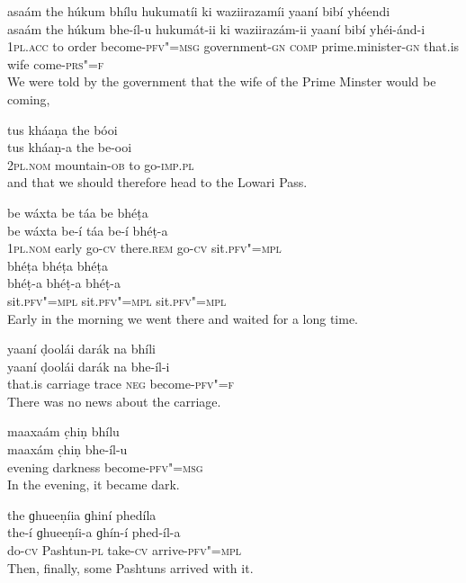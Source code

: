 \begin{exe}
\ex
\label{ex:1}
\glll asaám	the	húkum	bhílu	hukumatíi	ki waziirazamíi	yaaní	bibí	yhéendi \\
asaám	the	húkum	bhe-íl-u	hukumát-ii	ki waziirazám-ii	yaaní	bibí	yhéi-ánd-i \\
\textsc{1pl.acc} to	order	become-\textsc{pfv"=msg} government-\textsc{gn} \textsc{comp} prime.minister-\textsc{gn} that.is	wife	come-\textsc{prs"=f} \\
\glt We were told by the government that the wife of the Prime Minster would be coming,

\ex
\label{ex:2}
\glll tus	kháaṇa	the	bóoi \\
tus	kháaṇ-a the	be-ooi \\
\textsc{2pl.nom} mountain-\textsc{ob} to go-\textsc{imp.pl} \\
\glt and that we should therefore head to the Lowari Pass.

\ex
\label{ex:3}
\glll be	wáxta	be	táa	be	bhéṭa \\
be	wáxta	be-í	táa	be-í	bhéṭ-a \\
\textsc{1pl.nom}	early	go-\textsc{cv}	there.\textsc{rem}	go-\textsc{cv}	sit.\textsc{pfv"=mpl} \\
\glll bhéṭa	bhéṭa	bhéṭa \\
bhéṭ-a	bhéṭ-a	bhéṭ-a \\
sit.\textsc{pfv"=mpl}	sit.\textsc{pfv"=mpl}	sit.\textsc{pfv"=mpl} \\
\glt Early in the morning we went there and waited for a long time.

\ex
\label{ex:4}
\glll yaaní	ḍoolái	darák	na	bhíli \\
yaaní	ḍoolái	darák	na	bhe-íl-i \\
that.is	carriage	trace	\textsc{neg}	become-\textsc{pfv"=f} \\
\glt There was no news about the carriage.

\ex
\label{ex:5}
\glll maaxaám	c̣hiṇ	bhílu \\
maaxám	c̣hiṇ	bhe-íl-u \\
evening	darkness	become-\textsc{pfv"=msg} \\
\glt In the evening, it became dark.

\ex
\label{ex:6}
\glll the	ɡhueeṇíia	ɡhiní	phedíla \\
the-í	ɡhueeṇíi-a	ɡhín-í	phed-íl-a \\
do-\textsc{cv}	Pashtun-\textsc{pl}	take-\textsc{cv}	arrive-\textsc{pfv"=mpl} \\
\glt Then, finally, some Pashtuns arrived with it.


\end{exe}
